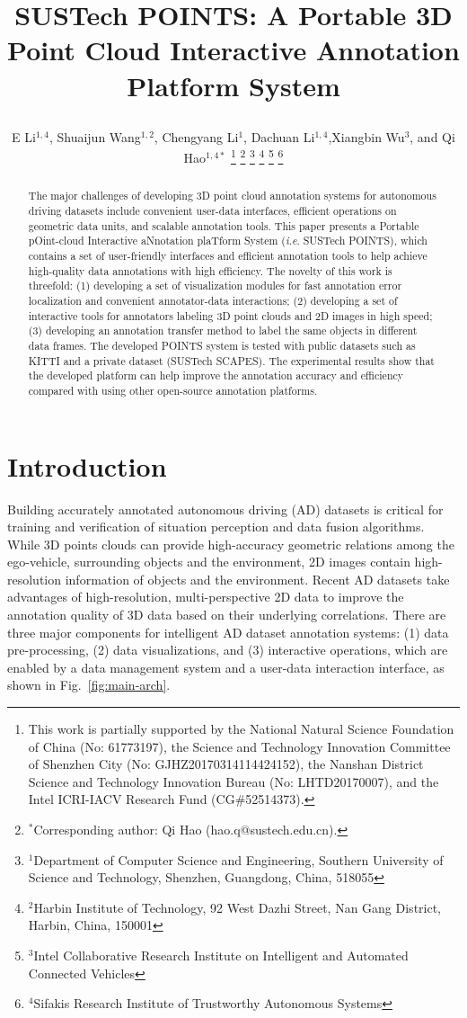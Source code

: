 \documentclass[letterpaper, 10 pt, conference]{ieeeconf}  %
\title{\LARGE \bf
SUSTech POINTS: A Portable 3D Point Cloud Interactive Annotation Platform System

}
\author{E Li$^{1,4}$, Shuaijun Wang$^{1,2}$,  Chengyang Li$^{1}$, Dachuan Li$^{1,4}$,Xiangbin Wu$^{3}$, and Qi Hao$^{1,4*}$%
\thanks{This work is partially supported by the National Natural Science Foundation of China (No: 61773197), the Science and Technology Innovation Committee of Shenzhen City (No: GJHZ20170314114424152), the Nanshan District Science and Technology Innovation Bureau (No: LHTD20170007), and the Intel ICRI-IACV Research Fund (CG$\#$52514373).}
\thanks{$^{*}$Corresponding author: Qi Hao (hao.q@sustech.edu.cn).}
\thanks{$^{1}$Department of Computer Science and Engineering,
Southern University of Science and Technology, Shenzhen, Guangdong, China, 518055}
\thanks{$^{2}$Harbin Institute of Technology,
92 West Dazhi Street, Nan Gang District, Harbin, China, 150001}
\thanks{$^{3}$Intel Collaborative Research Institute on Intelligent and Automated Connected Vehicles}
\thanks{$^{4}$Sifakis Research Institute of Trustworthy Autonomous Systems}

}
\begin{document}
\maketitle
\thispagestyle{empty}
\pagestyle{empty}
\begin{abstract}

The major challenges of developing 3D point cloud annotation systems for autonomous driving datasets include
convenient user-data interfaces, efficient operations on geometric data units, and scalable annotation tools. 
This paper presents a {Portable pOint-cloud Interactive aNnotation plaTform System} (\textit{i}.\textit{e}. SUSTech POINTS), 
which contains a set of user-friendly interfaces and efficient annotation tools to help achieve high-quality data annotations with high efficiency. 
The novelty of this work is threefold: 
(1) developing a set of visualization modules for fast annotation error localization and convenient annotator-data interactions; 
(2) developing a set of interactive tools for annotators labeling 3D point clouds and 2D images in high speed;
(3) developing an annotation transfer method to label the same objects in different data frames. 
The developed POINTS system is tested with public datasets such as KITTI and a private dataset (SUSTech SCAPES). 
The experimental results show that the developed platform can help improve the annotation accuracy and efficiency 
compared with using other open-source annotation platforms.



\end{abstract}






\section{Introduction}


Building accurately annotated autonomous driving (AD) datasets is critical for training and verification of situation perception and data fusion algorithms. 
While 3D points clouds can provide high-accuracy geometric relations among the ego-vehicle, surrounding objects and the environment, 
2D images contain high-resolution information of objects and the environment. 
Recent AD datasets take advantages of high-resolution, multi-perspective 2D data to improve the annotation quality of 3D data 
based on their underlying correlations. 
There are three major components for intelligent AD dataset annotation systems: 
(1) data pre-processing, (2) data visualizations, and (3) interactive operations, 
which are enabled by a data management system and a user-data interaction interface, as shown in Fig.~\ref{fig:main-arch}.
\end{document}
